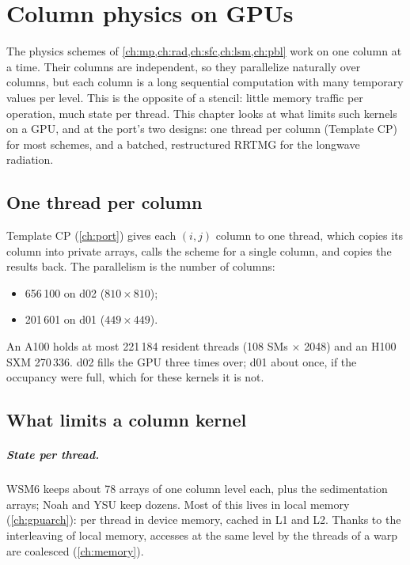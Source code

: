 \chapter{Column physics on GPUs}\label{ch:colphys}

The physics schemes of \cref{ch:mp,ch:rad,ch:sfc,ch:lsm,ch:pbl} work on one column at a time. Their columns are
independent, so they parallelize naturally over columns, but each column is a long sequential computation with many
temporary values per level. This is the opposite of a stencil: little memory traffic per operation, much state per
thread. This chapter looks at what limits such kernels on a GPU, and at the port's two designs: one thread per column
(Template CP) for most schemes, and a batched, restructured RRTMG for the longwave radiation.

\section{One thread per column}

Template CP (\cref{ch:port}) gives each $(i,j)$ column to one thread, which copies its column into private arrays,
calls the scheme for a single column, and copies the results back. The parallelism is the number of columns:
\begin{itemize}
  \item 656\,100 on d02 ($810 \times 810$);
  \item 201\,601 on d01 ($449 \times 449$).
\end{itemize}
An A100 holds at most 221\,184 resident threads (108 SMs $\times$ 2048) and an H100 SXM 270\,336. d02 fills the GPU
three times over; d01 about once, if the occupancy were full, which for these kernels it is not.

\section{What limits a column kernel}

\paragraph{State per thread.} WSM6 keeps about 78 arrays of one column level each, plus the sedimentation arrays; Noah
and YSU keep dozens. Most of this lives in local memory (\cref{ch:gpuarch}): per thread in device memory, cached in L1
and L2. Thanks to the interleaving of local memory, accesses at the same level by the threads of a warp are coalesced
(\cref{ch:memory}).

